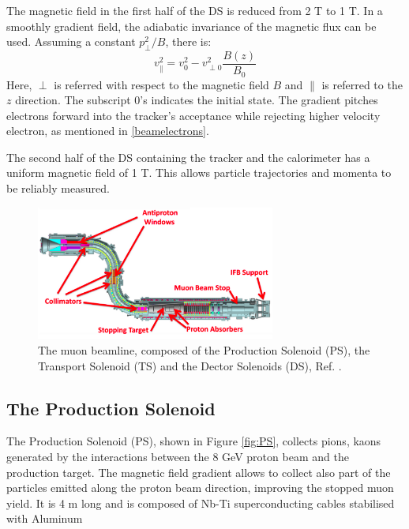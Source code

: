 The magnetic field in the first half of 
the DS is reduced from 2 T to 1 T. In a smoothly gradient field, the adiabatic 
invariance of the magnetic flux can be used. Assuming a constant $p^2_\perp/B$, there is:
\begin{equation}
    v^2_{\parallel}=v^2_0-v^2_{\perp 0}\frac{B(z)}{B_0}
\end{equation}
Here, $\perp$ is referred with respect to the magnetic field $B$ and $\parallel$ is 
referred to the $z$ direction. The subscript 0's indicates the initial state. 
The gradient pitches electrons forward into the tracker's acceptance
{\red while rejecting higher velocity electron, as mentioned in \ref{beamelectrons}.}

The second half of the DS containing the tracker and the calorimeter has a 
uniform magnetic field of 1 T.
{\red This allows particle trajectories and momenta to be reliably measured.}

\begin{figure}[!h]
\centering
\includegraphics[width =0.7\textwidth]{figures/png/Screenshot_20240303_152845.png}
\caption[The muon beamline.]{The muon beamline, composed of the Production Solenoid (PS), 
the Transport Solenoid (TS) and the Dector Solenoids (DS), Ref. \cite{ginther}. 
}
\label{fig:muonbeamline}
\end{figure}


\subsection{The Production Solenoid}
The Production Solenoid (PS), shown in Figure \ref{fig:PS}, collects pions, 
kaons generated by the interactions between the 8 GeV proton beam and the production target. 
The magnetic field gradient allows to collect also part of the particles 
emitted along the proton beam direction, improving the stopped muon yield.
It is 4 m long {\red and is composed of Nb-Ti superconducting cables stabilised with Aluminum}

